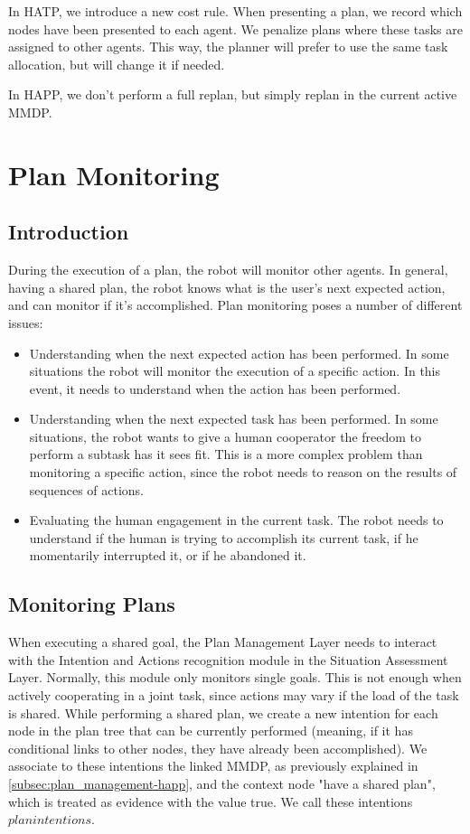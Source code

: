 In HATP, we introduce a new cost rule. When presenting a plan, we record which nodes have been presented to each agent. We penalize plans where these tasks are assigned to other agents. This way, the planner will prefer to use the same task allocation, but will change it if needed.

In HAPP, we don't perform a full replan, but simply replan in the current active MMDP. 


\section{Plan Monitoring}
\subsection{Introduction}
During the execution of a plan, the robot will monitor other agents. In general, having a shared plan, the robot knows what is the user's next expected action, and can monitor if it's accomplished. Plan monitoring poses a number of different issues:
\begin{itemize}
\item Understanding when the next expected action has been performed. In some situations the robot will monitor the execution of a specific action. In this event, it needs to understand when the action has been performed.
\item Understanding when the next expected task has been performed. In some situations, the robot wants to give a human cooperator the freedom to perform a subtask has it sees fit. This is a more complex problem than monitoring a specific action, since the robot needs to reason on the results of sequences of actions.
\item Evaluating the human engagement in the current task. The robot needs to understand if the human is trying to accomplish its current task, if he momentarily interrupted it, or if he abandoned it.
\end{itemize}

\subsection{Monitoring Plans}
When executing a shared goal, the Plan Management Layer needs to interact with the Intention and Actions recognition module in the Situation Assessment Layer. Normally, this module only monitors single goals. This is not enough when actively cooperating in a joint task, since actions may vary if the load of the task is shared. While performing a shared plan, we create a new intention for each node in the plan tree that can be currently performed (meaning, if it has conditional links to other nodes, they have already been accomplished). We associate to these intentions the linked MMDP, as previously explained in \ref{subsec:plan_management-happ}, and the context node "have a shared plan", which is treated as evidence with the value true. We call these intentions $plan intentions$.

